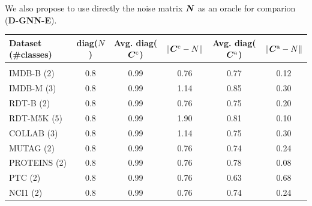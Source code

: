 \documentclass[portrait,final,a0paper,fontscale=0.365]{baposter}
\newcommand{\norm}[1]{\left\lVert#1\right\rVert}
\begin{document}
\begin{poster}
{\begin{multicols}{2}
\noindent
We also propose to use directly the noise matrix ${\bm{N}}$ as an oracle for comparion (\textbf{D-GNN-E}).

\end{multicols}

\hspace{5em}
\begin{tabular}{l|ccccc}
\bf{Dataset} (\#classes) & diag($N$) & Avg. diag(${\bm{C}}^{\text{c}}$) & $\norm{\mC^{\text{c}}-N}$ & Avg. diag(${\bm{C}}^{\text{a}}$) & $\norm{\mC^{\text{a}}-N}$ \\
\hline \\
IMDB-B   (2) & 0.8  & 0.99   & 0.76  & 0.77 & 0.12\\
IMDB-M   (3) & 0.8  & 0.99   & 1.14  & 0.85 & 0.30\\
RDT-B    (2) & 0.8  & 0.99   & 0.76  & 0.75 & 0.20\\
RDT-M5K  (5) & 0.8  & 0.99   & 1.90  & 0.81 & 0.10\\
COLLAB   (3) & 0.8  & 0.99   & 1.14  & 0.75 & 0.30\\
MUTAG    (2) & 0.8  & 0.99   & 0.76  & 0.74 & 0.24\\
PROTEINS (2) & 0.8  & 0.99   & 0.76  & 0.78 & 0.08\\
PTC      (2) & 0.8  & 0.99   & 0.76  & 0.63 & 0.68\\
NCI1     (2) & 0.8  & 0.99   & 0.76  & 0.74 & 0.24\\
\end{tabular}
\vspace{1em}
}

\end{poster}
\end{document}

